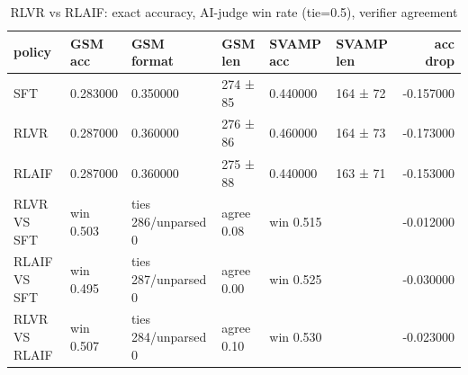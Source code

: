 \begin{table}
\caption{RLVR vs RLAIF: exact accuracy, AI-judge win rate (tie=0.5), verifier agreement}
\label{tab:t5_math}
\begin{tabular}{llllllr}
\toprule
policy & GSM acc & GSM format & GSM len & SVAMP acc & SVAMP len & acc drop \\
\midrule
SFT & 0.283000 & 0.350000 & 274 ± 85 & 0.440000 & 164 ± 72 & -0.157000 \\
RLVR & 0.287000 & 0.360000 & 276 ± 86 & 0.460000 & 164 ± 73 & -0.173000 \\
RLAIF & 0.287000 & 0.360000 & 275 ± 88 & 0.440000 & 163 ± 71 & -0.153000 \\
RLVR VS SFT & win 0.503 & ties 286/unparsed 0 & agree 0.08 & win 0.515 &  & -0.012000 \\
RLAIF VS SFT & win 0.495 & ties 287/unparsed 0 & agree 0.00 & win 0.525 &  & -0.030000 \\
RLVR VS RLAIF & win 0.507 & ties 284/unparsed 0 & agree 0.10 & win 0.530 &  & -0.023000 \\
\bottomrule
\end{tabular}
\end{table}
